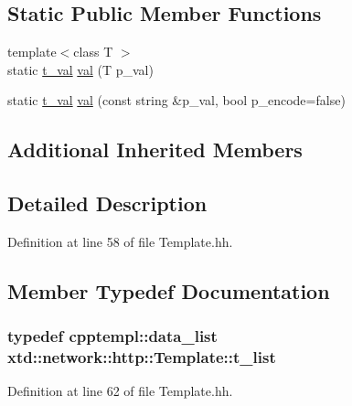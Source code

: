 \subsection*{Static Public Member Functions}
\begin{DoxyCompactItemize}
\item 
{\footnotesize template$<$class T $>$ }\\static \hyperlink{classxtd_1_1network_1_1http_1_1Template_a3834dff3cec2cc0fbc66efed74f29459}{t\-\_\-val} \hyperlink{classxtd_1_1network_1_1http_1_1Template_aab2224df74586a476877a36db8ea2473}{val} (T p\-\_\-val)
\item 
static \hyperlink{classxtd_1_1network_1_1http_1_1Template_a3834dff3cec2cc0fbc66efed74f29459}{t\-\_\-val} \hyperlink{classxtd_1_1network_1_1http_1_1Template_a3a96743542ae1a063e90ec3ec2e774f8}{val} (const string \&p\-\_\-val, bool p\-\_\-encode=false)
\end{DoxyCompactItemize}
\subsection*{Additional Inherited Members}


\subsection{Detailed Description}


Definition at line 58 of file Template.\-hh.



\subsection{Member Typedef Documentation}
\hypertarget{classxtd_1_1network_1_1http_1_1Template_a8ff314b3439353e666efc48a8443ea17}{
\subsubsection[{t\-\_\-list}]{\setlength{\rightskip}{0pt plus 5cm}typedef {\bf cpptempl\-::data\-\_\-list} {\bf xtd\-::network\-::http\-::\-Template\-::t\-\_\-list}}}\label{classxtd_1_1network_1_1http_1_1Template_a8ff314b3439353e666efc48a8443ea17}


Definition at line 62 of file Template.\-hh.

